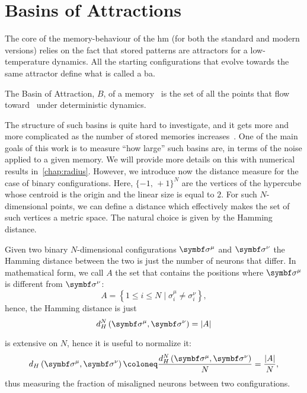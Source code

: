 \documentclass[\rootdir/main.tex]{subfiles}
\begin{document}
\section{Basins of Attractions}
The core of the memory-behaviour of the \acrlong{hm} (for both the standard and modern versions) relies on the fact that stored patterns are attractors for a low-temperature dynamics. All the starting configurations that evolve towards the same attractor define what is called a \acrfull{ba}. 
\begin{definition}
The Basin of Attraction, $B$, of a memory \bxi\ is the set of all the points that flow toward \bxi\ under deterministic dynamics.
\end{definition}
The structure of such basins is quite hard to investigate, and it gets more and more complicated as the number of stored memories increases~\cite{Keeler}. One of the main goals of this work is to measure ``how large'' such basins are, in terms of the noise applied to a given memory. We will provide more details on this with numerical results in~\cref{chap:radius}.
However, we introduce now the distance measure for the case of binary configurations. Here, $\{-1, \, +1\}^{N}$ are the vertices of the hypercube whose centroid is the origin and the linear size is equal to $2$. For such $N$-dimensional points, we can define a distance which effectively makes the set of such vertices a metric space. The natural choice is given by the Hamming distance.
\begin{definition}
\label{def:hop:hamming_distance}
Given two binary $N$-dimensional configurations $\bsigma^{\mu}$ and $\bsigma^\nu$ the Hamming distance between the two is just the number of neurons that differ. In mathematical form, we call ${A}$ the set that contains the positions where $\bsigma^\mu$ is different from $\bsigma^\nu$:
\begin{equation*}
    {A} = \left\{ 1 \leq i \leq N \mid \sigma_i^\mu \neq \sigma_i^\nu  \right\},
\end{equation*}
hence, the Hamming distance is just
\begin{equation}\label{eq:hamming_distance}
    d_H^N\left(\bsigma^\mu, \bsigma^\nu \right) =  |A|
\end{equation}
\end{definition}
\begin{remark}
 is extensive on $N$, hence it is useful to normalize it:
\begin{equation}
    d_H\left(\bsigma^\mu, \bsigma^\nu \right) \coloneq \frac{d_H^N\left(\bsigma^\mu, \bsigma^\nu \right)}{N} = \frac{|A|}{N},
\end{equation}
thus measuring the fraction of misaligned neurons between two configurations.
\end{remark}
\end{document}
